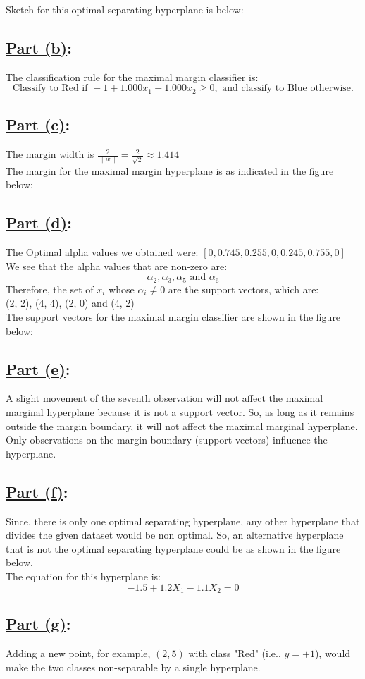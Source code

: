 \documentclass[12pt]{article}
\begin{document}
Sketch for this optimal separating hyperplane is below:


\subsection*{\underline{Part (b)}:}
The classification rule for the maximal margin classifier is:
\[
  \text{Classify to Red if } -1 + 1.000x_1 - 1.000x_2 \geq 0, \text{ and classify to Blue otherwise.}
\]

\subsection*{\underline{Part (c)}:}
The margin width is \(\frac{2}{\|w\|} = \frac{2}{\sqrt{2}} \approx 1.414\)\\
The margin for the maximal margin hyperplane is as indicated in the figure below:

\subsection*{\underline{Part (d)}:}
The Optimal alpha values we obtained were: $[0, 0.745,  0.255, 0, 0.245, 0.755, 0]$\\
We see that the alpha values that are non-zero are:
\[\alpha_2, \alpha_3, \alpha_5 \text{ and } \alpha_6\]
Therefore, the set of $x_i$ whose $\alpha_i \neq 0$ are the support vectors, which are:\\
(2, 2), (4, 4), (2, 0) and (4, 2)\\
The support vectors for the maximal margin classifier are shown in the figure below:

\subsection*{\underline{Part (e)}:}
A slight movement of the seventh observation will not affect the maximal marginal hyperplane because it is not a support vector. So, as long as it remains outside the margin boundary, it will not affect the maximal marginal hyperplane. Only observations on the margin boundary (support vectors) influence the hyperplane.

\subsection*{\underline{Part (f)}:}
Since, there is only one optimal separating hyperplane, any other hyperplane that divides the given dataset would be non optimal.
So, an alternative hyperplane that is not the optimal separating hyperplane could be as shown in the figure below.\\
The equation for this hyperplane is:
\[-1.5 + 1.2X_1 - 1.1X_2 = 0\]

\subsection*{\underline{Part (g)}:}
Adding a new point, for example, \( (2, 5) \) with class "Red" (i.e., \( y = +1 \)), would make the two classes non-separable by a single hyperplane.
\end{document}

